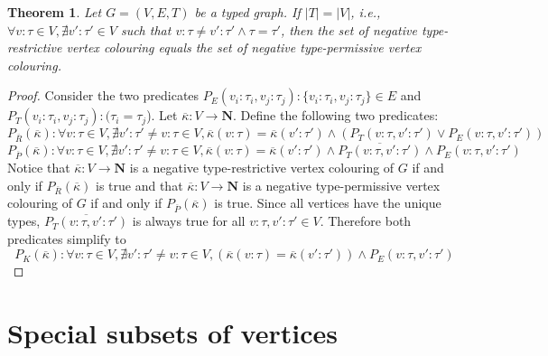 \documentclass[preprint,12pt]{elsarticle}
\theoremstyle{plain}
\newtheorem{theorem}{Theorem}[section]
\newcommand\tyv[2]{#1\!\!:\!\!#2}
\begin{document}
\begin{theorem}\label{theorem:negvertcolour}
Let $G = (V,E,T)$ be a typed graph.
If $|T|=|V|$, i.e.,
$\forall \tyv{v}{\tau} \in V, \nexists \tyv{v'}{\tau'} \in V$
such that $\tyv{v}{\tau} \neq \tyv{v'}{\tau'} \wedge \tau=\tau'$,
then
the set of negative type-restrictive vertex colouring equals
the set of negative type-permissive vertex colouring.
\end{theorem}
\begin{proof}
Consider the two predicates
$P_E(\tyv{v_i}{\tau_i}, \tyv{v_j}{\tau_j}): \{\tyv{v_i}{\tau_i}, \tyv{v_j}{\tau_j}\}\in E$
and
$P_T(\tyv{v_i}{\tau_i}, \tyv{v_j}{\tau_j}):(\tau_i=\tau_j$).
Let $\overline{\kappa}:V\rightarrow \mathbf{N}$.
Define the following two predicates:
\[
P_{\overline{R}}(\overline{\kappa})\!: \forall \tyv{v}{\tau}\in V, \nexists \tyv{v'}{\tau'}\neq \tyv{v}{\tau}\in V,
\overline{\kappa}(\tyv{v}{\tau})=\overline{\kappa}(\tyv{v'}{\tau'})\wedge({P_T(\tyv{v}{\tau},\tyv{v'}{\tau'})}\vee P_E(\tyv{v}{\tau},\tyv{v'}{\tau'}))
\]
\[
P_{\overline{P}}(\overline{\kappa})\!: \forall \tyv{v}{\tau}\in V, \nexists \tyv{v'}{\tau'}\neq \tyv{v}{\tau}\in V,
\overline{\kappa}(\tyv{v}{\tau})=\overline{\kappa}(\tyv{v'}{\tau'})\wedge \overline{P_T(\tyv{v}{\tau},\tyv{v'}{\tau'})}\wedge P_E(\tyv{v}{\tau},\tyv{v'}{\tau'})
\]
Notice that $\overline{\kappa}:V\rightarrow \mathbf{N}$
is a negative type-restrictive vertex colouring of $G$
if and only if $P_{\overline{R}}(\overline{\kappa})$ is true
and that
$\overline{\kappa}:V\rightarrow \mathbf{N}$
is a negative type-permissive vertex colouring of $G$
if and only if $P_{\overline{P}}(\overline{\kappa})$ is true.
Since all vertices have the unique types,
$\overline{P_T(\tyv{v}{\tau},\tyv{v'}{\tau'})}$ is
always true for all 
$\tyv{v}{\tau},\tyv{v'}{\tau'}\in V$.
Therefore both predicates simplify to
\[
P_K(\overline{\kappa}): \forall \tyv{v}{\tau}\in V, \nexists \tyv{v'}{\tau'}\neq \tyv{v}{\tau}\in V,
(\overline{\kappa}(\tyv{v}{\tau})=\overline{\kappa}(\tyv{v'}{\tau'}))\wedge P_E(\tyv{v}{\tau},\tyv{v'}{\tau'})
\]
\end{proof}

\section{Special subsets of vertices}
\end{document}
